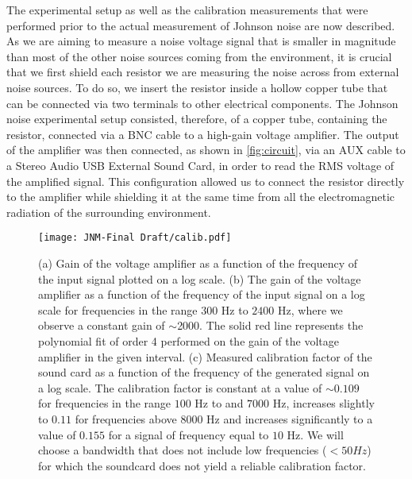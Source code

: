 \begin{linenumbers}
The experimental setup as well as the calibration measurements that were performed prior to the actual measurement of Johnson noise are now described. As we are aiming to measure a noise voltage signal that is smaller in magnitude than most of the other noise sources coming from the environment, it is crucial that we first shield each resistor we are measuring the noise across from external noise sources. To do so, we insert the resistor inside a hollow copper tube that can be connected via two terminals to other electrical components. The Johnson noise experimental setup consisted, therefore, of a copper tube, containing the resistor, connected via a BNC cable to a high-gain voltage amplifier. The output of the amplifier was then connected, as shown in \ref{fig:circuit}, via an AUX cable to a Stereo Audio USB External Sound Card, in order to read the RMS voltage of the amplified signal. This configuration allowed us to connect the resistor directly to the amplifier while shielding it at the same time from all the electromagnetic radiation of the surrounding environment.
\begin{figure}
\center
\texttt{[image: JNM-Final Draft/calib.pdf]}
\caption{(a) Gain of the voltage amplifier as a function of the frequency of the input signal plotted on a log scale. (b) The gain of the voltage amplifier as a function of the frequency of the input signal on a log scale for frequencies in the range $300$ Hz to $2400$ Hz, where we observe a constant gain of $\sim$2000. The solid red line represents the polynomial fit of order 4 performed on the gain of the voltage amplifier in the given interval. (c) Measured calibration factor of the sound card as a function of the frequency of the generated signal on a log scale. The calibration factor is constant at a value of $\sim0.109 $ for frequencies in the range $100$ Hz to and $7000$ Hz, increases slightly to $0.11 $ for frequencies above $8000$ Hz and increases significantly to a value of $0.155$ for a signal of frequency equal to $10$ Hz. We will choose a bandwidth that does not include low frequencies ($<50Hz$) for which the soundcard does not yield a reliable calibration factor.}
\label{calib} 
\end{figure}


\end{linenumbers}
